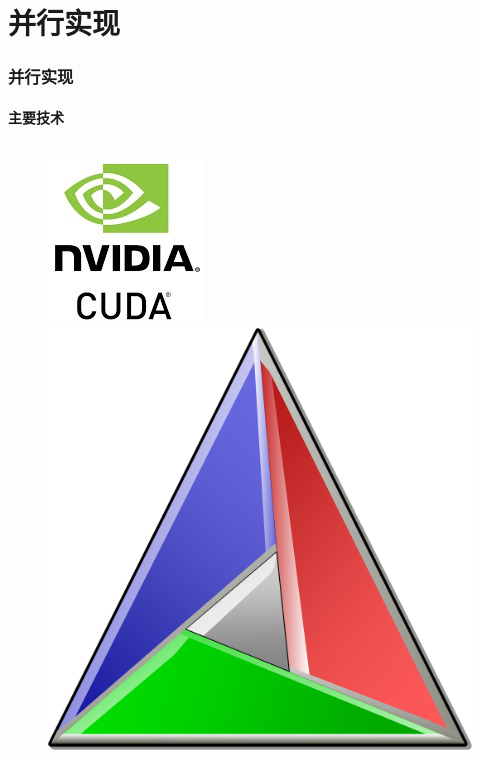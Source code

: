 \documentclass[aspectratio=43, xcolor=svgnames, t, 10pt]{beamer}
\begin{document}
\section{并行实现}
\begin{frame}
  \frametitle{并行实现}
  \framesubtitle{主要技术}
  \begin{columns}
    \begin{column}{0.2\linewidth}
      \begin{figure}
        \centering
        \begin{minipage}[b]{\linewidth}
          \includegraphics[width=\linewidth]{./figure/cuda_logo2.jpg}
        \end{minipage}
        \begin{minipage}[b]{\linewidth}
          \includegraphics[width=\linewidth]{./figure/cmake_logo.png}

\end{minipage}
\end{figure}
\end{column}
\end{columns}
\end{frame}
\end{document}
